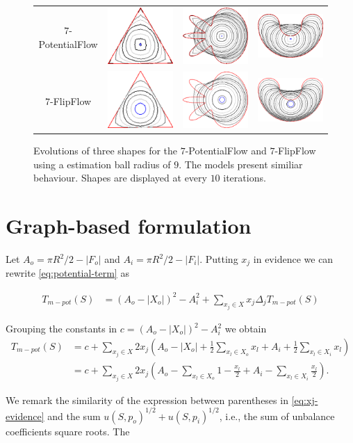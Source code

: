\begin{figure}
\begin{tabular}{cccc}
$7$-PotentialFlow & \includegraphics[scale=0.25]{figures/chapter7/potential-flow/triangle/summary.pdf} & \includegraphics[scale=0.25]{figures/chapter7/potential-flow/flower/summary.pdf} & \includegraphics[scale=0.25]{figures/chapter7/potential-flow/bean/summary.pdf} \\
$7$-FlipFlow & \includegraphics[scale=0.25]{figures/chapter7/flip-flow/triangle/summary.pdf} & \includegraphics[scale=0.25]{figures/chapter7/flip-flow/flower/summary.pdf} & \includegraphics[scale=0.25]{figures/chapter7/flip-flow/bean/summary.pdf} \\
\end{tabular}
\caption{Evolutions of three shapes for the $7$-PotentialFlow and $7$-FlipFlow using a estimation ball radius of $9$. The models present similiar behaviour. Shapes are displayed at every $10$ iterations.}
\label{fig:potential-flow-flip-flow-comparison}
\end{figure}

\section{Graph-based formulation}

Let $A_o = \pi R^2 / 2 - |F_o|$ and $A_i = \pi R^2/2 - |F_i|$. Putting $x_j$ in evidence we can rewrite \eqref{eq:potential-term} as

\begin{align*}
	T_{m-pot}(S) &= (A_o - |X_o|)^2 - A_i^2 + \sum_{x_j \in X}{x_j\Delta_j T_{m-pot}(S)}
\end{align*} 

Grouping the constants in $c=(A_o - |X_o|)^2 - A_i^2$ we obtain
\begin{align}
	T_{m-pot}(S) &= c +\sum_{x_j \in X}{ 2x_j( A_o - |X_o| + \frac{1}{2}\sum_{x_l \in X_o}{x_l} + A_i + \frac{1}{2}\sum_{x_l \in X_i}{x_l})} \nonumber \\
	&= c +\sum_{x_j \in X}{2x_j( A_o - \sum_{x_l \in X_o}{1-\frac{x_l}{2}} + A_i - \sum_{x_l \in X_i}{\frac{x_l}{2}})}.
	\label{eq:xj-evidence}
\end{align}

We remark the similarity of the expression between parentheses in \eqref{eq:xj-evidence} and the sum $u(S,p_o)^{1/2} + u(S,p_i)^{1/2}$, i.e., the sum of unbalance coefficients square roots. The 